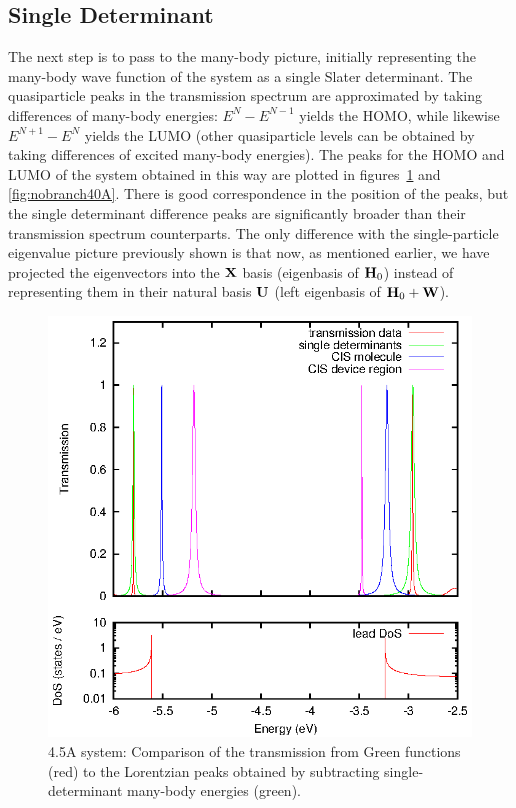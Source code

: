 \subsection{Single Determinant}
\label{subsec:SingleDeterminant}

The next step is to pass to the many-body picture, initially representing the
many-body wave function of the system as a single Slater determinant. The
quasiparticle peaks in the transmission spectrum are approximated by taking
differences of many-body energies: $E^N - E^{N-1}$ yields the \ac{HOMO}, while
likewise $E^{N+1} - E^N$ yields the \ac{LUMO} (other quasiparticle levels can be
obtained by taking differences of excited many-body energies). The peaks for
the \ac{HOMO} and \ac{LUMO} of the system obtained in this way are plotted in
figures~\ref{fig:nobranch45A} and \ref{fig:nobranch40A}. There is good
correspondence in the position of the peaks, but the single determinant
difference peaks are significantly broader than their transmission spectrum
counterparts. The only difference with the single-particle eigenvalue picture
previously shown is that now, as mentioned earlier, we have projected the
eigenvectors into the $\mathbf{X}$ basis (eigenbasis of $\mathbf{H}_0$) instead of
representing them in their natural basis $\mathbf{U}$ (left eigenbasis of
$\mathbf{H}_0 + \mathbf{W}$).

\begin{figure}[h]
	\begin{center}
		\includegraphics[width=0.9\linewidth]{figures/nobrsingles45A.eps}
	\end{center}
	\caption{4.5A system: Comparison of the transmission from Green
                 functions (red) to the Lorentzian peaks obtained by
                 subtracting single-determinant many-body energies (green).}
	\label{fig:nobranch45A}
\end{figure}

